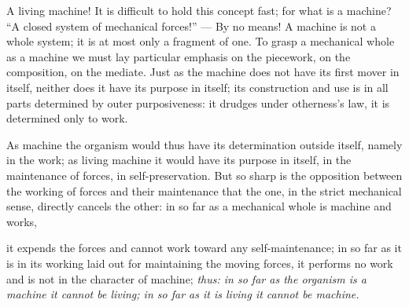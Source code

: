 \documentclass[12pt,a4paper]{book}
\begin{document}
A living machine! It is difficult to hold this concept fast; for what is a machine?
``A closed system of mechanical forces!'' --- By no means! A machine is not a whole
system; it is at most only a fragment of one. To grasp a mechanical whole as a
machine we must lay particular emphasis on the piecework, on the composition, on the
mediate. Just as the machine does not have its first mover in itself, neither does
it have its purpose in itself; its construction and use is in all parts determined
by outer purposiveness: it drudges under otherness's law, it is determined only to
work.

As machine the organism would thus have its determination outside itself, namely in
the work; as living machine it would have its purpose in itself, in the maintenance
of forces, in self-preservation. But so sharp is the opposition between the working
of forces and their maintenance that the one, in the strict mechanical sense,
directly cancels the other: in so far as a mechanical whole is machine and works,

\setcounter{footnote}{0}
it expends the forces and cannot work toward any self-maintenance; in so far as it
is in its working laid out for maintaining the moving forces, it performs no work
and is not in the character of machine; \emph{thus: in so far as the organism is a
machine it cannot be living; in so far as it is living it cannot be machine.}
\end{document}
